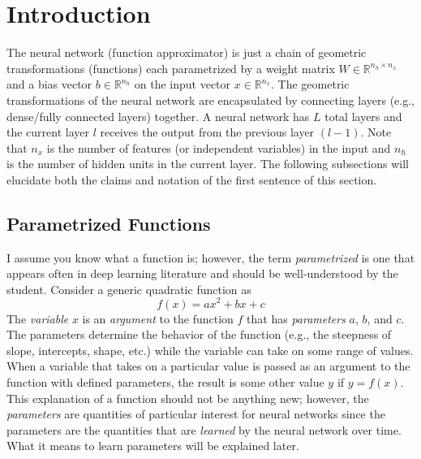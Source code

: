 \documentclass{article}
\begin{document}
\section{Introduction}

The neural network (function approximator) is just a chain of geometric transformations (functions)
each parametrized by a weight matrix $W \in \mathbb{R}^{n_h \times n_x}$ and
a bias vector $b \in \mathbb{R}^{n_h}$ on the input vector $x \in \mathbb{R}^{n_x}$.
The geometric transformations of the neural network are encapsulated by connecting
layers (e.g., dense/fully connected layers) together. A neural network has $L$ total
layers and the current layer $l$ receives the output from the previous layer $(l-1)$.
Note that $n_x$ is the number of features (or independent variables) in the input
and $n_h$ is the number of hidden units in the current layer. The following subsections will
elucidate both the claims and notation of the first sentence of this section.

\subsection{Parametrized Functions}

I assume you know what a function is; however, the term \textit{parametrized}
is one that appears often in deep learning literature and should be well-understood by the student.
Consider a generic quadratic function \cite{MathSEVarsParamsArgs2015} as
\begin{equation}
	f(x) = ax^{2} + bx + c
\end{equation}
The \textit{variable} $x$ is an \textit{argument} to the function $f$ that has
\textit{parameters} $a$, $b$, and $c$. The parameters determine the behavior of
the function (e.g., the steepness of slope, intercepts, shape, etc.) while the
variable can take on some range of values. When a variable that takes on a particular
value is passed as an argument to the function with defined parameters, the result
is some other value $y$ if $y = f(x)$. This explanation of a function
should not be anything new; however, the \textit{parameters} are quantities
of particular interest for neural networks since the parameters are the quantities
that are \textit{learned} by the neural network over time. What it means to learn
parameters will be explained later.
\end{document}
